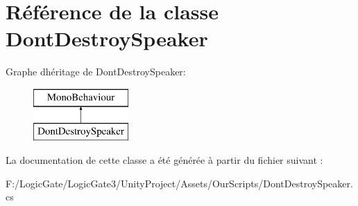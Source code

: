 \hypertarget{class_dont_destroy_speaker}{}\section{Référence de la classe Dont\+Destroy\+Speaker}
\label{class_dont_destroy_speaker}
Graphe d\textquotesingle{}héritage de Dont\+Destroy\+Speaker\+:\begin{figure}[H]
\begin{center}
\leavevmode
\includegraphics[height=2.000000cm]{class_dont_destroy_speaker}
\end{center}
\end{figure}


La documentation de cette classe a été générée à partir du fichier suivant \+:\begin{DoxyCompactItemize}
\item 
F\+:/\+Logic\+Gate/\+Logic\+Gate3/\+Unity\+Project/\+Assets/\+Our\+Scripts/Dont\+Destroy\+Speaker.\+cs\end{DoxyCompactItemize}
